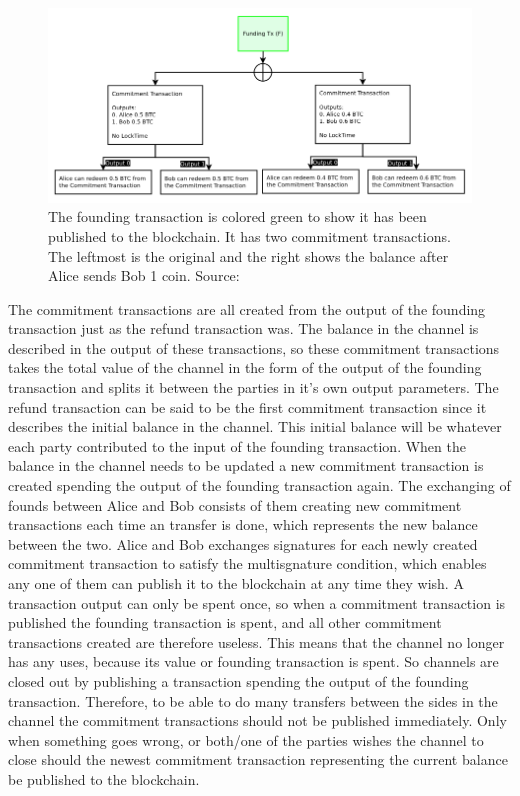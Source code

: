 \begin{figure}[h]
    \centering
    \includegraphics[width=12cm]{figures/ln_commit.png}
    \caption{The founding transaction is colored green to show it has been published to the blockchain. It has two commitment transactions. The leftmost is the original and the right shows the balance after Alice sends Bob 1 coin. Source: \cite{poon2015bitcoin}}
    \label{fig:ln_commit}
\end{figure}

The commitment transactions are all created from the output of the founding transaction just as the refund transaction was. The balance in the channel is described in the output of these transactions, so these commitment transactions takes the total value of the channel in the form of the output of the founding transaction and splits it between the parties in it's own output parameters. The refund transaction can be said to be the first commitment transaction since it describes the initial balance in the channel. This initial balance will be whatever each party contributed to the input of the founding transaction. When the balance in the channel needs to be updated a new commitment transaction is created spending the output of the founding transaction again. The exchanging of founds between Alice and Bob consists of them creating new commitment transactions each time an transfer is done, which represents the new balance between the two. Alice and Bob exchanges signatures for each newly created commitment transaction to satisfy the multisgnature condition, which enables any one of them can publish it to the blockchain at any time they wish. A transaction output can only be spent once, so when a commitment transaction is published the founding transaction is spent, and all other commitment transactions created are therefore useless. This means that the channel no longer has any uses, because its value or founding transaction is spent. So channels are closed out by publishing a transaction spending the output of the founding transaction. Therefore, to be able to do many transfers between the sides in the channel the commitment transactions should not be published immediately. Only when something goes wrong, or both/one of the parties wishes the channel to close should the newest commitment transaction representing the current balance be published to the blockchain. 

